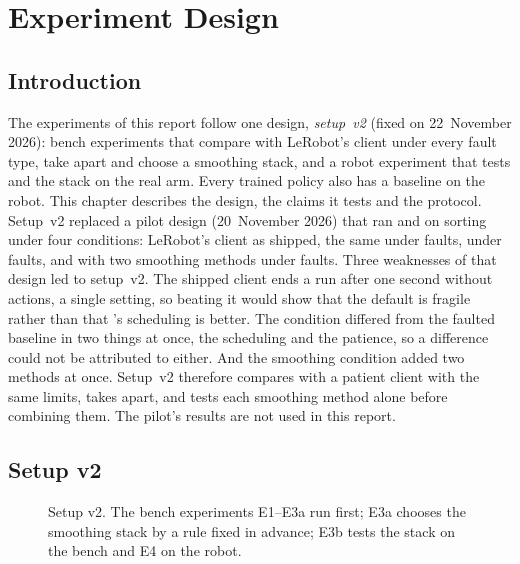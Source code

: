\chapter{Experiment Design}\label{ch:design}

\section{Introduction}
The experiments of this report follow one design, \emph{setup~v2} (fixed on 22~November 2026): bench experiments that
compare \drtc{} with LeRobot's client under every fault type, take \drtc{} apart and choose a smoothing stack, and a
robot experiment that tests \drtc{} and the stack on the real arm. Every trained policy also has a baseline on the
robot. This chapter describes the design, the claims it tests and the protocol.
Setup~v2 replaced a pilot design (20~November 2026) that ran \smolvla{} and \groot{} on sorting under four conditions:
LeRobot's client as shipped, the same under faults, \drtc{} under faults, and \drtc{} with two smoothing methods under
faults. Three weaknesses of that design led to setup~v2. The shipped client ends a run after one second without
actions, a single setting, so beating it would show that the default is fragile rather than that \drtc's scheduling
is better. The \drtc{} condition differed from the faulted baseline in two things at once, the scheduling and the
patience, so a difference could not be attributed to either. And the smoothing condition added two methods at once.
Setup~v2 therefore compares \drtc{} with a patient client with the same limits, takes \drtc{} apart, and tests each
smoothing method alone before combining them. The pilot's results are not used in this report.

\section{Setup v2}\label{sec:setupv2}

\begin{figure}[htbp]
  \centering
  
  \caption{Setup v2. The bench experiments E1--E3a run first; E3a chooses the smoothing stack by a rule fixed in
           advance; E3b tests the stack on the bench and E4 on the robot.}
  \label{fig:design}
\end{figure}

